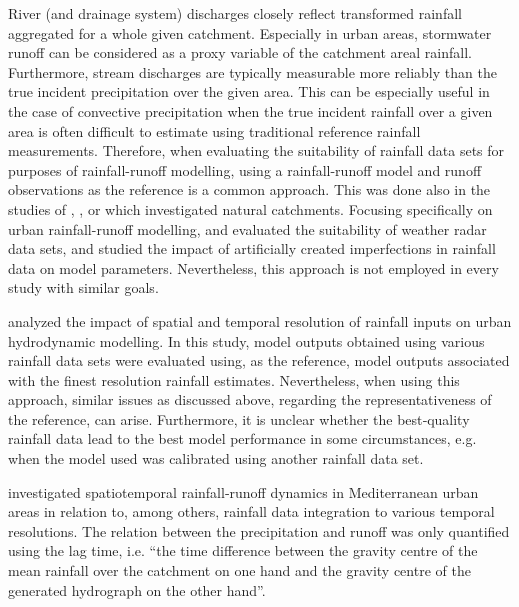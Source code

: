 \documentclass{ctuthesis}\usepackage[]{graphicx}\usepackage[]{color}
\begin{document}
River (and drainage system) discharges closely reflect transformed rainfall aggregated for a whole given catchment. Especially in urban areas, stormwater runoff can be considered as a proxy variable of the catchment areal rainfall. Furthermore, stream discharges are typically measurable more reliably than the true incident precipitation over the given area. This can be especially useful in the case of convective precipitation when the true incident rainfall over a given area is often difficult to estimate using traditional reference rainfall measurements.  Therefore, when evaluating the suitability of rainfall data sets for purposes of rainfall-runoff modelling, using a rainfall-runoff model and runoff observations as the reference is a common approach.  This was done also in the studies of \cite{obledSensitivityHydrologicalModels1994}, \cite{segondSignificanceSpatialRainfall2007}, or \cite{sikorskaValueDifferentPrecipitation2018} which investigated natural catchments. Focusing specifically on urban rainfall-runoff modelling, \cite{goormansUsingLocalWeather2013} and \cite{wangSingularitysensitiveGaugebasedRadar2015} evaluated the suitability of weather radar data sets, and \citep{kleidorferImpactInputData2009} studied the impact of artificially created imperfections in rainfall data on model parameters. Nevertheless, this approach is not employed in every study with similar goals. 

\cite{ochoa-rodriguezImpactSpatialTemporal2015} analyzed the impact of spatial and temporal resolution of rainfall inputs on urban hydrodynamic modelling. In this study, model outputs obtained using various rainfall data sets were evaluated using, as the reference, model outputs associated with the finest resolution rainfall estimates. Nevertheless, when using this approach, similar issues as discussed above, regarding the representativeness of the reference, can arise. Furthermore, it is unclear whether the best‐quality rainfall data lead to the best model performance in some circumstances, e.g. when the model used was calibrated using another rainfall data set.

\cite{berneTemporalSpatialResolution2004} investigated spatiotemporal rainfall‐runoff dynamics in Mediterranean urban areas in relation to, among others, rainfall data integration to various temporal resolutions. The relation between the precipitation and runoff was only quantified using the lag time, i.e. “the time difference between the gravity centre of the mean rainfall over the catchment on one hand and the gravity centre of the generated hydrograph on the other hand”. 
\end{document}
